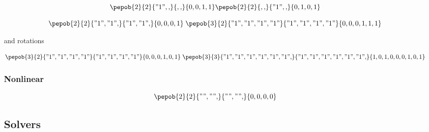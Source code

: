 \documentclass[twocolumn]{article}
\newcounter{a}
\newcounter{b}
\begin{document}
\begin{equation}\label{2dblocksorder2}
    \pepob{2}{2}{{"1",,}}{{,,}}{{0,0,1,1}}  \pepob{2}{2}{{,,}}{{"1",,}}{{0,1,0,1}}
\end{equation}

\begin{equation}
    \pepob{2}{2}{{"1","1",}}{{"1","1",}}{{0,0,0,1}} \;
    \pepob{3}{2}{{"1","1","1","1"}}{{"1","1","1","1"}}{{0,0,0,1,1,1}}
\end{equation}

and rotations

\begin{equation}
    \pepob{3}{2}{{"1","1","1","1"}}{{"1","1","1","1"}}{{0,0,0,1,0,1}} \;   \pepob{3}{3}{{"1","1","1","1","1","1",}}{{"1","1","1","1","1","1",}}{{1,0,1,0,0,0,1,0,1}}
\end{equation}

\subsubsection{Nonlinear}

\begin{equation}
    {\pepob{2}{2}{{"","",}}{{"","",}}{{0,0,0,0}}}
\end{equation}

\subsection{Solvers}
\end{document}
